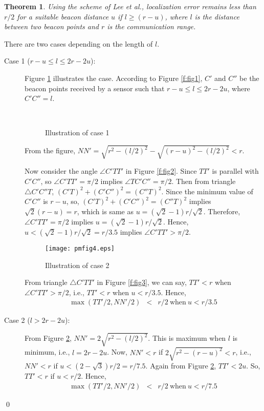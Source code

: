 \documentclass[preprint,11pt]{elsarticle}
\newtheorem{theorem}{Theorem}
\newenvironment{proof}{\noindent{\bf Proof: }}{\qed \smallbreak}
\begin{document}
\begin{theorem}
\label{the1:errbd}
Using the scheme \cite{Lee2009} of Lee et al., localization error remains less than $r/2$  for a suitable beacon
distance $u$ if $l\geq (r-u)$, where $l$ is the distance between two beacon points and $r$ is the communication range.
\end{theorem}
\begin{proof}
There are two cases depending on the length of $l$.
\begin{description}
\item[Case 1 ($r-u\leq l \leq 2r-2u$):]
Figure \ref{f:figCase1} illustrates the case.
According to  Figure \ref{f:fig1}, $C'$ and $C''$ be the beacon points received by a sensor such that $r-u\leq l \leq 2r-2u$,
where $C'C''=l$.
\begin{figure}[h]
    \centering
    ~~
    ~~
\caption{Illustration of case 1}\label{f:figCase1}
\end{figure}

From the figure, $NN'=\sqrt{r^2-(l/2)^2}-\sqrt{(r-u)^2-(l/2)^2} < r$.

Now consider the angle $\angle C'TT'$ in Figure \ref{f:fig2}. Since $TT'$ is parallel
with $C'C''$, so $\angle C'TT'=\pi/2$ implies $\angle TC'C''=\pi/2$. Then from triangle
$\triangle C'C''T$, $(C'T)^2+(C'C'')^2=(C''T)^2$. Since the minimum value of $C'C''$ is $r-u$,
so, $(C'T)^2+(C'C'')^2=(C''T)^2$ implies $\sqrt2(r-u)=r$, which is same as $u=(\sqrt 2-1)r/\sqrt 2$.
Therefore, $\angle C'TT'=\pi/2$ implies $u=(\sqrt 2-1)r/\sqrt 2$.
Hence, $u<(\sqrt 2-1)r/\sqrt 2=r/3.5$ implies $\angle C'TT'>\pi/2$.
\begin{figure}[h]
\centering
\texttt{[image: pmfig4.eps]}
\caption{Illustration of case 2}\label{f:fig4}
\end{figure}

From triangle $\triangle C'TT'$ in Figure \ref{f:fig3}, we can say, $TT'<r$ when $\angle C'TT'>\pi/2$, i.e.,
$TT'<r$ when $u<r/3.5$. Hence,
\begin{eqnarray}\label{eq:1}
  \max(TT'/2, NN'/2) &<& r/2~ \text{when}~ u<r/3.5
\end{eqnarray}
\item[Case 2 ($l>2r-2u$):] From Figure \ref{f:fig4}, $NN'=2\sqrt{r^2-(l/2)^2}$. This is maximum when
$l$ is minimum, i.e., $l=2r-2u$. Now, $NN'<r$ if $2\sqrt{r^2-(r-u)^2}<r$, i.e.,
$NN'<r$ if $u<(2-\sqrt 3)r/2=r/7.5$. Again from Figure \ref{f:fig4}, $TT'<2u$. So, $TT'<r$ if $u<r/2$.
Hence,
\begin{eqnarray}\label{eq:2}
  \max(TT'/2, NN'/2) &<& r/2~ \text{when}~ u<r/7.5
\end{eqnarray}
\end{description}


\end{proof}
\end{document}

